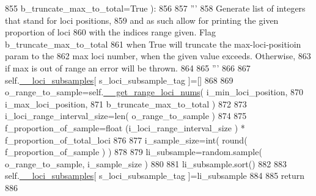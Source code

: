 \begin{DoxyCode}
855             b\_truncate\_max\_to\_total=\textcolor{keyword}{True} ):
856             
857         \textcolor{stringliteral}{'''}
858 \textcolor{stringliteral}{        Generate list of integers that stand for loci positions,}
859 \textcolor{stringliteral}{        and as such allow for printing the given proportion of loci}
860 \textcolor{stringliteral}{        with the indices range given.  Flag b\_truncate\_max\_to\_total}
861 \textcolor{stringliteral}{        when True will truncate the max-loci-positioin param to the}
862 \textcolor{stringliteral}{        max loci number, when the given value exceeds.  Otherwise,}
863 \textcolor{stringliteral}{        if max is out of range an error will be thrown.}
864 \textcolor{stringliteral}{}
865 \textcolor{stringliteral}{        '''}
866 
867         self.\hyperlink{classnegui_1_1genepopfilemanager_1_1GenepopFileManager_af867ba70728e8a3aaf0097ddd6399e28}{\_\_loci\_subsamples}[ s\_loci\_subsample\_tag ]=[]
868         
869         o\_range\_to\_sample=self.\hyperlink{classnegui_1_1genepopfilemanager_1_1GenepopFileManager_aaa92e1946fdacb522325a288e00eac71}{\_\_get\_range\_loci\_nums}( i\_min\_loci\_position, 
870                                                             i\_max\_loci\_position,
871                                                             b\_truncate\_max\_to\_total )
872         
873         i\_loci\_range\_interval\_size=len( o\_range\_to\_sample )
874 
875         f\_proportion\_of\_sample=float (i\_loci\_range\_interval\_size  ) * f\_proportion\_of\_total\_loci 
876 
877         i\_sample\_size=int( round(  f\_proportion\_of\_sample ) )
878 
879         li\_subsample=random.sample( o\_range\_to\_sample, i\_sample\_size )
880 
881         li\_subsample.sort()
882 
883         self.\hyperlink{classnegui_1_1genepopfilemanager_1_1GenepopFileManager_af867ba70728e8a3aaf0097ddd6399e28}{\_\_loci\_subsamples}[ s\_loci\_subsample\_tag ]=li\_subsample
884 
885         \textcolor{keywordflow}{return}
886 
\end{DoxyCode}
